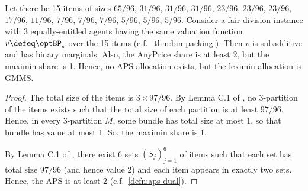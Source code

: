 \begin{lemma}
\label{cex:gmms-not-aps-binary-subadd}
Let there be 15 items of sizes
$65/96$, $31/96$, $31/96$, $31/96$, $23/96$, $23/96$, $23/96$, $17/96$,
$11/96$, $7/96$, $7/96$, $7/96$, $5/96$, $5/96$, $5/96$.
Consider a fair division instance with 3 equally-entitled agents having
the same valuation function $v \defeq \optBP_s$ over the 15 items (c.f.~\cref{thm:bin-packing}).
Then $v$ is subadditive and has binary marginals.
Also, the AnyPrice share is at least 2, but the maximin share is 1.
Hence, no APS allocation exists, but the leximin allocation is GMMS.
\end{lemma}
\begin{proof}
The total size of the items is $3 \times 97/96$.
By Lemma C.1 of \cite{babaioff2023fair}, no $3$-partition of the items exists
such that the total size of each partition is at least $97/96$.
Hence, in every 3-partition $M$, some bundle has total size at most 1, so that bundle has value at most 1.
So, the maximin share is 1.

By Lemma C.1 of \cite{babaioff2023fair}, there exist 6 sets $(S_j)_{j=1}^6$ of items
such that each set has total size $97/96$ (and hence value 2) and each item appears in exactly two sets.
Hence, the APS is at least 2 (c.f.~\cref{defn:aps-dual}).
\end{proof}
